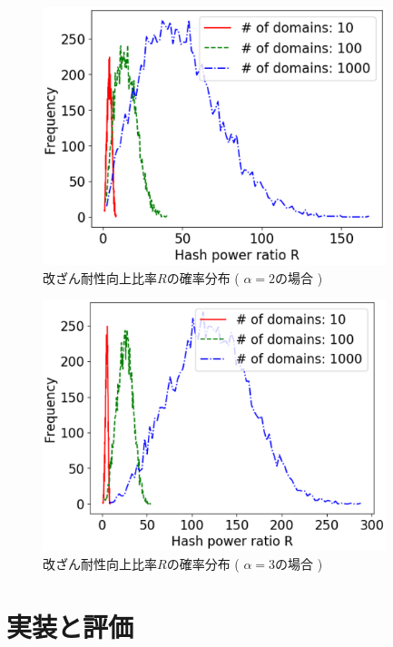 \documentclass[a4paper,12pt]{jsarticle}
\begin{document}
%
\begin{figure}[th]%
  \begin{center}
    \includegraphics[width=100mm]{pht/hist-comp-R-alpha2.0-m1.0.eps}
  \end{center}
  \caption{改ざん耐性向上比率$R$の確率分布 ( $\alpha=2$の場合 ) }
  \label{fig:alpha2}
\end{figure}
%
%
\begin{figure}[H]%
  \begin{center}
    \includegraphics[width=100mm]{pht/hist-comp-R-alpha3.0-m1.0.eps}
  \end{center}
  \caption{改ざん耐性向上比率$R$の確率分布 ( $\alpha=3$の場合 ) }
  \label{fig:alpha3}
\end{figure}
%
\newpage
%

\section{実装と評価}
\end{document}
